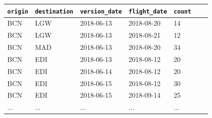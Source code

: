 \begin{table}[H]
\centering
\begin{tabular}{|p{2.5cm}|p{2.5cm}|p{3cm}|p{3cm}|p{2.5cm}|p{2.5cm}|p{1cm}|}
\hline
\texttt{origin}       & \texttt{destination}   & \texttt{version\_date}       & \texttt{flight\_date}        & \texttt{count}       \\ \hline
BCN                   & LGW                    & 2018-06-13                   & 2018-08-20                   & 14                   \\ \hline
BCN                   & LGW                    & 2018-06-13                   & 2018-08-21                   & 12                   \\ \hline
BCN                   & MAD                    & 2018-06-13                   & 2018-08-20                   & 34                   \\ \hline
\cellcolor{blue!5}BCN & \cellcolor{blue!5}EDI  & \cellcolor{blue!5}2018-06-13 & \cellcolor{blue!5}2018-08-12 & \cellcolor{blue!5}20 \\ \hline
\cellcolor{blue!5}BCN & \cellcolor{blue!5}EDI  & \cellcolor{blue!5}2018-06-14 & \cellcolor{blue!5}2018-08-12 & \cellcolor{blue!5}20 \\ \hline
\cellcolor{blue!5}BCN & \cellcolor{blue!5}EDI  & \cellcolor{blue!5}2018-06-15 & \cellcolor{blue!5}2018-08-12 & \cellcolor{blue!5}30 \\ \hline
BCN                   & EDI                    & 2018-06-15                   & 2018-09-14                   & 25                   \\ \hline
...                   & ...                    & ...                          & ...                          & ...                  \\ \hline
\end{tabular}
\end{table}

